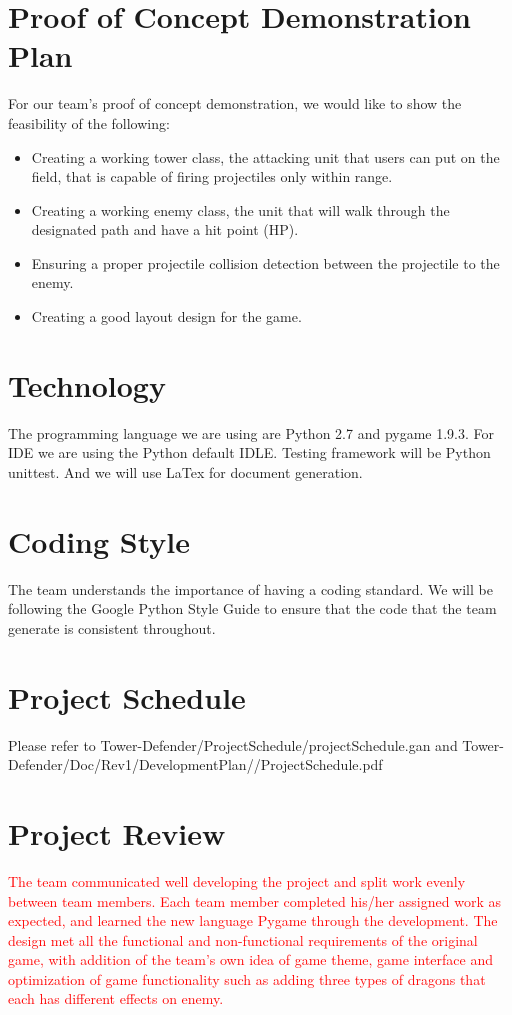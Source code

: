 \documentclass{article}
\begin{document}
\section{Proof of Concept Demonstration Plan}
For our team’s proof of concept demonstration, we would like to show the feasibility of the following:
\begin{itemize}
    \item Creating a working tower class, the attacking unit that users can put on the field,  that is capable of firing projectiles only within range.
    \item Creating a working enemy class, the unit that will walk through the designated path and have a hit point (HP).
    \item Ensuring a proper projectile collision detection between the projectile to the enemy.
    \item Creating a good layout design for the game.
\end{itemize}

\section{Technology}
The programming language we are using are Python 2.7 and pygame 1.9.3. For IDE we are using the Python default IDLE. Testing framework will be Python unittest. And we will use LaTex for document generation.

\section{Coding Style}
The team understands the importance of having a coding standard. We will be following the Google Python Style Guide to ensure that the code that the team generate is consistent throughout.

\section{Project Schedule}
Please refer to Tower-Defender/ProjectSchedule/projectSchedule.gan and Tower-Defender/Doc/Rev1/DevelopmentPlan//ProjectSchedule.pdf


\section{Project Review}
\textcolor{red}{The team communicated well developing the project and split work evenly between team members. Each team member completed his/her assigned work as expected, and learned the new language Pygame through the development. The design met all the functional and non-functional requirements of the original game, with addition of the team's own idea of game theme, game interface and optimization of game functionality such as adding three types of dragons that each has different effects on enemy. }
\end{document}
